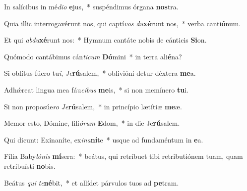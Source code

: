 \item In salícibus in mé\textit{di}\textit{o} \textbf{e}jus,~* suspéndimus órgana \textbf{nos}tra.
\item Quia illic interrogavérunt nos, qui captí\textit{vos} \textit{du}\textbf{xé}runt nos,~* verba canti\textbf{ó}num.
\item Et qui \textit{ab}\textit{du}\textbf{xé}runt nos:~* Hymnum cantáte nobis de cánticis \textbf{Si}on.
\item Quómodo cantábimus cán\textit{ti}\textit{cum} \textbf{Dó}mini~* in terra ali\textbf{é}na?
\item Si oblítus fúero tu\textit{i}, \textit{Je}\textbf{rú}salem,~* oblivióni detur déxtera \textbf{me}a.
\item Adhǽreat lingua mea fáu\textit{ci}\textit{bus} \textbf{me}is,~* si non memínero \textbf{tu}i.
\item Si non proposúe\textit{ro} \textit{Je}\textbf{rú}salem,~* in princípio lætítiæ \textbf{me}æ.
\item Memor esto, Dómine, fili\textit{ó}\textit{rum} \textbf{E}dom,~* in die Je\textbf{rú}salem.
\item Qui dicunt: Exinaníte, ex\textit{i}\textit{na}\textbf{ní}te~* usque ad fundaméntum in \textbf{e}a.
\item Fília Baby\textit{ló}\textit{nis} \textbf{mí}sera:~* beátus, qui retríbuet tibi retributiónem tuam, quam retribuísti \textbf{no}bis.
\item Beátus \textit{qui} \textit{te}\textbf{né}bit,~* et allídet párvulos tuos ad \textbf{pe}tram.
